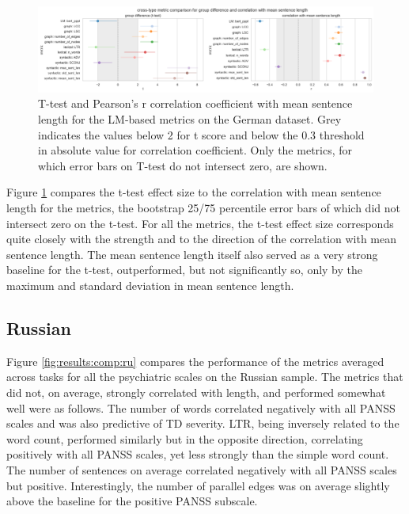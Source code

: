\begin{figure}[ht!]
    \includegraphics[width=1.1\textwidth, center]{Figures/chapter_4/compare/de_compare_t.png} 
\captionsetup{width=\textwidth}
\caption[Metric Comparison: German, T-Test]{\label{fig:results:comp:de:ttest} T-test and Pearson's r correlation coefficient with mean sentence length for the LM-based metrics on the German dataset. Grey indicates the values below 2 for t score and below the 0.3 threshold in absolute value for correlation coefficient. Only the metrics, for which error bars on T-test do not intersect zero, are shown.}
\end{figure}

Figure \ref{fig:results:comp:de:ttest} compares the t-test effect size to the correlation with mean sentence length for the metrics, the bootstrap 25/75 percentile error bars of which did not intersect zero on the t-test. For all the metrics, the t-test effect size corresponds quite closely with the strength and to the direction of the correlation with mean sentence length. The mean sentence length itself also served as a very strong baseline for the t-test, outperformed, but not significantly so, only by the maximum and standard deviation in mean sentence length. 

\subsection{Russian}

Figure \ref{fig:results:comp:ru} compares the performance of the metrics averaged across tasks for all the psychiatric scales on the Russian sample. The metrics that did not, on average, strongly correlated with length, and performed somewhat well were as follows. The number of words correlated negatively with all PANSS scales and was also predictive of TD severity. LTR, being inversely related to the word count, performed similarly but in the opposite direction, correlating positively with all PANSS scales, yet less strongly than the simple word count. The number of sentences on average correlated negatively with all PANSS scales but positive. Interestingly, the number of parallel edges was on average slightly above the baseline for the positive PANSS subscale.


